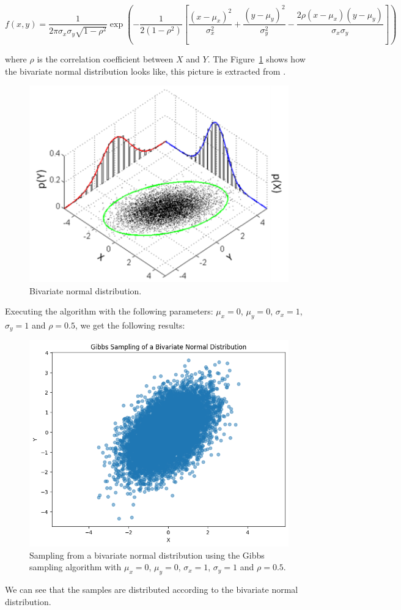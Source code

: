 \documentclass{report}
\begin{document}
\[
	f(x,y) = \frac{1}{2 \pi \sigma_x \sigma_y \sqrt{1 - \rho^2}} \exp \left( -\frac{1}{2(1 - \rho^2)} \left[ \frac{(x - \mu_x)^2}{\sigma_x^2} + \frac{(y - \mu_y)^2}{\sigma_y^2} - \frac{2 \rho (x - \mu_x)(y - \mu_y)}{\sigma_x \sigma_y} \right] \right)
\]

where $\rho$ is the correlation coefficient between $X$ and $Y$. The Figure~\ref{fig:bivariatenormal} shows how the bivariate normal distribution looks like, this picture is extracted from \cite{wiki:bivariatenormal}.

\begin{figure}[H]
	\centering
	\includegraphics[width=0.5\linewidth]{./Figures/MCMC/MultivariateNormal-2.png}
	\caption{Bivariate normal distribution.}
	\label{fig:bivariatenormal}
\end{figure}

Executing the algorithm with the following parameters: $\mu_x = 0$, $\mu_y = 0$, $\sigma_x = 1$, $\sigma_y = 1$ and $\rho = 0.5$, we get the following results:

\begin{figure}[H]
	\centering
	\includegraphics[width=0.5\linewidth]{./Figures/MCMC/bivariates.png}
	\caption{Sampling from a bivariate normal distribution using the Gibbs sampling algorithm with $\mu_x = 0$, $\mu_y = 0$, $\sigma_x = 1$, $\sigma_y = 1$ and $\rho = 0.5$.}
	\label{fig:bivariatenormal2}
\end{figure}

We can see that the samples are distributed according to the bivariate normal distribution.
\end{document}
